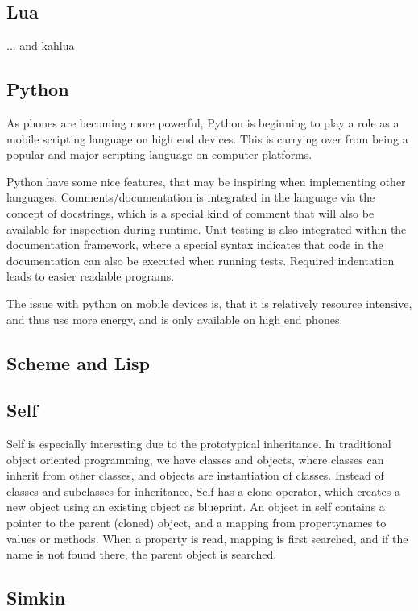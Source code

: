 \documentclass[11pt]{report}
\begin{document}
\subsection{Lua}
... and kahlua

\subsection{Python}
As phones are becoming more powerful, Python is beginning to play a role as a mobile scripting language on high end devices. This is carrying over from being a popular and major scripting language on computer platforms.

Python have some nice features, that may be inspiring when implementing other languages. Comments/documentation is integrated in the language via the concept of docstrings, which is a special kind of comment that will also be available for inspection during runtime. Unit testing is also integrated within the documentation framework, where a special syntax indicates that code in the documentation can also be executed when running tests.
Required indentation leads to easier readable programs.

The issue with python on mobile devices is, that it is relatively resource intensive, and thus use more energy, and is only available on high end phones.

\subsection{Scheme and Lisp}
\subsection{Self}
\label{survey-self}
Self \cite{self} is especially interesting due to the prototypical inheritance.
In traditional object oriented programming, we have classes and objects, where classes can inherit from other classes, and objects are instantiation of classes.
Instead of classes and subclasses for inheritance, Self has a clone operator, which creates a new object using an existing object as blueprint.
An object in self contains a pointer to the parent (cloned) object, and a mapping from propertynames to values or methods. When a property is read, mapping is first searched, and if the name is not found there, the parent object is searched.
\subsection{Simkin}
\end{document}
